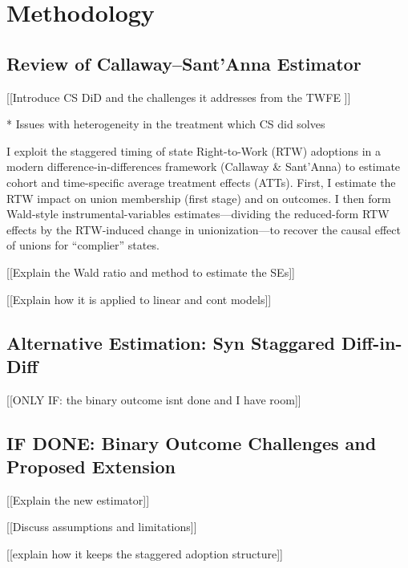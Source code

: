 \section{Methodology}
\subsection{Review of Callaway–Sant’Anna Estimator}




[[Introduce CS DiD and the challenges it addresses from the TWFE ]]

* Issues with heterogeneity in the treatment which CS did solves 

I exploit the staggered timing of state Right-to-Work (RTW) adoptions in a modern difference-in-differences framework (Callaway \& Sant'Anna) to estimate cohort and time-specific average treatment effects (ATTs).
First, I estimate the RTW impact on union membership (first stage) and on outcomes. 
I then form Wald-style instrumental-variables estimates—dividing the reduced-form RTW effects by the RTW-induced change in unionization—to recover the causal effect of unions for “complier” states. 

[[Explain the Wald ratio and method to estimate the SEs]]



[[Explain how it is applied to linear and cont models]]

\subsection{Alternative Estimation: Syn Staggared Diff-in-Diff}
[[ONLY IF: the binary outcome isnt done and I have room]]
\subsection{IF DONE: Binary Outcome Challenges and Proposed Extension}
[[Explain the new estimator]]

[[Discuss assumptions and limitations]]



[[explain how it keeps the staggered adoption structure]]


